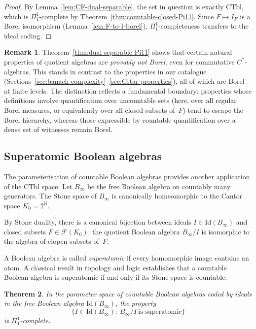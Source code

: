\documentclass[12pt,fleqn,a4paper]{amsart}
\numberwithin{equation}{section}
\newtheorem{theorem}{Theorem}[section]
\theoremstyle{definition}
\newtheorem{remark}[theorem]{Remark}
\newcommand{\N}{\mathbb{N}}
\newcommand{\Id}{\mathrm{Id}}
\newcommand{\CTbl}{\mathrm{CTbl}}
\begin{document}
\begin{proof}
By Lemma~\ref{lem:CF-dual-separable}, the set in question is exactly $\CTbl$,
which is $\Pi^1_1$-complete by Theorem~\ref{thm:countable-closed-Pi11}.
Since $F\mapsto I_F$ is a Borel isomorphism (Lemma~\ref{lem:F-to-I-borel}),
$\Pi^1_1$-completeness transfers to the ideal coding.
\end{proof}

\begin{remark}\label{rem:Pi11-calibration}
Theorem~\ref{thm:dual-separable-Pi11} shows that certain natural properties of
quotient algebras are \emph{provably not Borel}, even for commutative $C^*$-algebras.
This stands in contrast to the properties in our catalogue
(Sections~\ref{sec:banach-complexity}--\ref{sec:Cstar-properties}), all of which are
Borel at finite levels.  The distinction reflects a fundamental boundary: properties
whose definitions involve quantification over uncountable sets (here, over all
regular Borel measures, or equivalently over all closed subsets of~$F$) tend to escape
the Borel hierarchy, whereas those expressible by countable quantification over
a dense set of witnesses remain Borel.
\end{remark}

\subsection{Superatomic Boolean algebras}\label{subsec:superatomic}

The parameterisation of countable Boolean algebras provides another application
of the $\CTbl$ space.  Let $B_\infty$ be the free Boolean algebra on countably many
generators.  The Stone space of $B_\infty$ is canonically homeomorphic to the Cantor
space $K_0=2^\N$.

By Stone duality, there is a canonical bijection between ideals
$I\in\Id(B_\infty)$ and closed subsets $F\in\mathscr F(K_0)$: the quotient Boolean
algebra $B_\infty/I$ is isomorphic to the algebra of clopen subsets of~$F$.

A Boolean algebra is called \emph{superatomic} if every homomorphic image contains
an atom.  A classical result in topology and logic establishes that a countable
Boolean algebra is superatomic if and only if its Stone space is countable.

\begin{theorem}\label{thm:superatomic-Pi11}
In the parameter space of countable Boolean algebras coded by ideals in the free
Boolean algebra $\Id(B_\infty)$, the property
\[
\{I\in\Id(B_\infty):\ B_\infty/I\ \text{is superatomic}\}
\]
is $\Pi^1_1$-complete.
\end{theorem}
\end{document}
